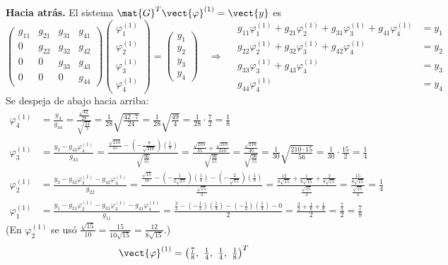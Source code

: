 \textbf{Hacia atrás.} El sistema $\mat{G}^T\vect{\varphi}^{(1)} = \vect{y}$ es
\[
\begin{pmatrix}
	g_{11} & g_{21} & g_{31} & g_{41}\\
	0 & g_{22} & g_{32} & g_{42}\\
	0 & 0 & g_{33} & g_{43}\\
	0 & 0 & 0 & g_{44}
\end{pmatrix}
\begin{pmatrix} \varphi_1^{(1)}\\ \varphi_2^{(1)}\\ \varphi_3^{(1)}\\ \varphi_4^{(1)} \end{pmatrix}
=
\begin{pmatrix} y_1\\ y_2\\ y_3\\ y_4 \end{pmatrix}
\quad\Longrightarrow\quad
\begin{aligned}
	g_{11}\varphi_1^{(1)} + g_{21}\varphi_2^{(1)} + g_{31}\varphi_3^{(1)} + g_{41}\varphi_4^{(1)} &= y_1\\
	g_{22}\varphi_2^{(1)} + g_{32}\varphi_3^{(1)} + g_{42}\varphi_4^{(1)} &= y_2\\
	g_{33}\varphi_3^{(1)} + g_{43}\varphi_4^{(1)} &= y_3\\
	g_{44}\varphi_4^{(1)} &= y_4
\end{aligned}
\]
Se despeja de abajo hacia arriba:
\begin{align*}
	\varphi_4^{(1)} &= \frac{y_4}{g_{44}} = \frac{\tfrac{\sqrt{42}}{28}}{\sqrt{\tfrac{24}{7}}}
	= \frac{1}{28}\sqrt{\frac{42\cdot 7}{24}} = \frac{1}{28}\sqrt{\frac{49}{4}} = \frac{1}{28}\cdot\frac72 = \frac18\\[8pt]
	\varphi_3^{(1)} &= \frac{y_3 - g_{43}\varphi_4^{(1)}}{g_{33}}
	= \frac{\tfrac{\sqrt{210}}{35} - \left(-\tfrac{8}{\sqrt{210}}\right)\left(\tfrac18\right)}{\sqrt{\tfrac{56}{15}}}
	= \frac{\tfrac{\sqrt{210}}{35} + \tfrac{\sqrt{210}}{210}}{\sqrt{\tfrac{56}{15}}}
	= \frac{\tfrac{\sqrt{210}}{30}}{\sqrt{\tfrac{56}{15}}} = \frac{1}{30}\sqrt{\frac{210\cdot15}{56}} = \frac{1}{30}\cdot\frac{15}{2} = \frac14\\[8pt]
	\varphi_2^{(1)} &= \frac{y_2 - g_{32}\varphi_3^{(1)} - g_{42}\varphi_4^{(1)}}{g_{22}}
	= \frac{\tfrac{\sqrt{15}}{10} - \left(-\tfrac{1}{2\sqrt{15}}\right)\left(\tfrac14\right) - \left(-\tfrac{2}{\sqrt{15}}\right)\left(\tfrac18\right)}{\tfrac{\sqrt{15}}{2}}
	= \frac{\tfrac{12}{8\sqrt{15}} + \tfrac{1}{8\sqrt{15}} + \tfrac{2}{8\sqrt{15}}}{\tfrac{\sqrt{15}}{2}}
	= \frac{\tfrac{15}{8\sqrt{15}}}{\tfrac{\sqrt{15}}{2}} = \frac14\\[8pt]
	\varphi_1^{(1)} &= \frac{y_1 - g_{21}\varphi_2^{(1)} - g_{31}\varphi_3^{(1)} - g_{41}\varphi_4^{(1)}}{g_{11}}
	= \frac{\tfrac32 - \left(-\tfrac12\right)\left(\tfrac14\right) - \left(-\tfrac12\right)\left(\tfrac14\right) - 0}{2}
	= \frac{\tfrac32 + \tfrac18 + \tfrac18}{2} = \frac{\tfrac74}{2} = \frac78
\end{align*}
(En $\varphi_2^{(1)}$ se usó $\tfrac{\sqrt{15}}{10} = \tfrac{15}{10\sqrt{15}} = \tfrac{12}{8\sqrt{15}}$.)
\[
\vect{\varphi}^{(1)} = \left(\tfrac78,\ \tfrac14,\ \tfrac14,\ \tfrac18\right)^T
\]

